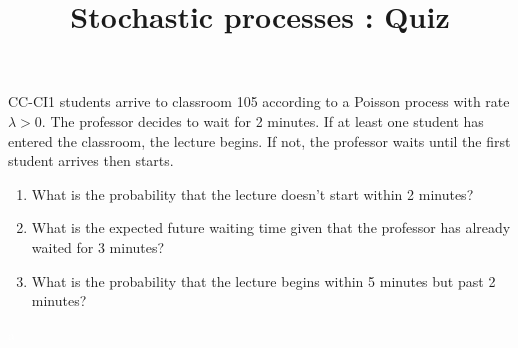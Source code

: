 \documentclass[12pt,a4paper]{article}
\title{ \bfseries \Huge {Stochastic processes : Quiz}}
\date{}
\newcounter{num}  %
\begin{document}
	\maketitle


CC-CI1 students arrive to classroom 105 according to a Poisson process with rate $\lambda>0$.
The professor decides to wait for 2 minutes. If at least one student has entered the classroom, the lecture begins. If not, the professor waits until the first student arrives then starts.
\begin{enumerate}
\item What is the probability that the lecture doesn't start within 2 minutes?
\vspace{5cm}
\item What is the expected future waiting time given that the professor has already waited for 3 minutes?
\vspace{5cm}
\item What is the probability that the lecture begins within 5 minutes but past 2 minutes?
\vspace{5cm}
\end{enumerate}
\newpage

\textcolor{white}{a}

\vspace{24cm}

\end{document}

